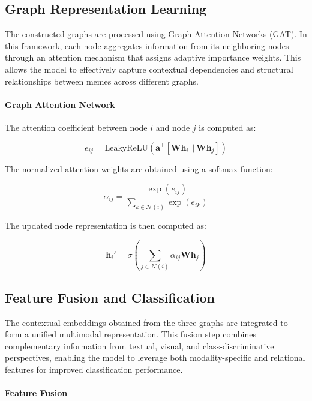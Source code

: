 \documentclass[a4paper]{cas-sc}
\begin{document}
\subsection{Graph Representation Learning}

The constructed graphs are processed using Graph Attention Networks (GAT). In this framework, each node aggregates information from its neighboring nodes through an attention mechanism that assigns adaptive importance weights. This allows the model to effectively capture contextual dependencies and structural relationships between memes across different graphs.

\paragraph{Graph Attention Network}

The attention coefficient between node $i$ and node $j$ is computed as:

\begin{equation}
e_{ij} = \text{LeakyReLU}(\mathbf{a}^\top [\mathbf{W}\mathbf{h}_i \, || \, \mathbf{W}\mathbf{h}_j])
\end{equation}

The normalized attention weights are obtained using a softmax function:

\begin{equation}
\alpha_{ij} = \frac{\exp(e_{ij})}
{\sum_{k \in \mathcal{N}(i)} \exp(e_{ik})}
\end{equation}

The updated node representation is then computed as:

\begin{equation}
\mathbf{h}_i' = \sigma \left( \sum_{j \in \mathcal{N}(i)} \alpha_{ij} \mathbf{W}\mathbf{h}_j \right)
\end{equation}

\subsection{Feature Fusion and Classification}

The contextual embeddings obtained from the three graphs are integrated to form a unified multimodal representation. This fusion step combines complementary information from textual, visual, and class-discriminative perspectives, enabling the model to leverage both modality-specific and relational features for improved classification performance.

\paragraph{Feature Fusion}
\end{document}
